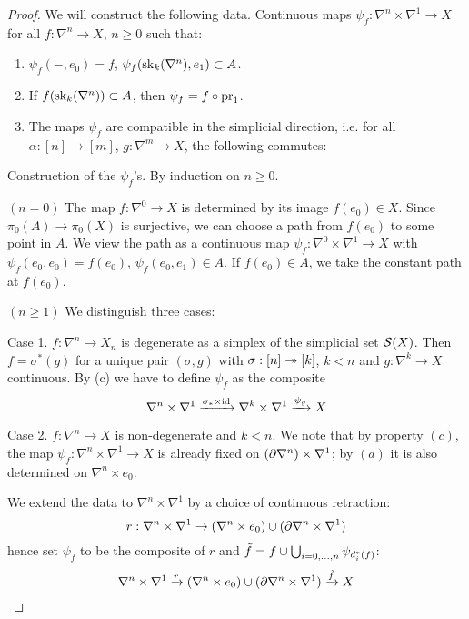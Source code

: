 \begin{proof}
We will construct the following data. Continuous maps $\psi_f:\nabla^n\times\nabla^1\to X$ for all $f:\nabla^n\to X$, $n\geq 0$ such that:
\begin{enumerate}[label={(\alph*)}]
    \item $\psi_f(-,e_0)=f$, $\psi_f(\sk_k(\ns),e_1)\subset A$.
    \item If $f(\sk_k(\ns))\subset A$, then $\psi_f=f\circ\pr_1$.
    \item The maps $\psi_f$ are compatible in the simplicial direction, i.e. for all $\alpha:[n]\to[m]$, $g:\nabla^m\to X$, the following commutes:
    \begin{center}
    \end{center}
\end{enumerate}

Construction of the $\psi_f$'s. By induction on $n\geq0$.

$(n=0)$ The map $f:\nabla^0\to X$ is determined by its image $f(e_0)\in X$. Since $\pi_0(A)\to\pi_0(X)$ is surjective, we can choose a path from $f(e_0)$ to some point in $A$. We view the path as a continuous map $\psi_f:\nabla^0\times\nabla^1\to X$ with $\psi_f(e_0,e_0)=f(e_0)$, $\psi_f(e_0,e_1)\in A$. If $f(e_0)\in A$, we take the constant path at $f(e_0)$.

$(n\geq1)$ We distinguish three cases:

Case 1. $f:\nabla^n\to X_n$ is degenerate as a simplex of the simplicial set $\S(X)$. Then $f=\sigma^*(g)$ for a unique pair $(\sigma,g)$ with $\sigma:[n]\onto[k]$, $k<n$ and $g:\nabla^k\to X$ continuous. By (c) we have to define $\psi_f$ as the composite
\[\nabla^n\times\nabla^1\xto{\sigma_*\times\id}\nabla^k\times\nabla^1\xto{\psi_g} X\]

Case 2. $f:\nabla^n\to X$ is non-degenerate and $k<n$. We note that by property $(c)$, the map $\psi_f:\nabla^n\times\nabla^1\to X$ is already fixed on $(\de\nabla^n)\times\nabla^1$; by $(a)$ it is also determined on $\nabla^n\times e_0$.

We extend the data to $\nabla^n\times\nabla^1$ by a choice of continuous retraction:
\[r:\nabla^n\times\nabla^1\to (\nabla^n\times e_0)\cup(\de\nabla^n\times\nabla^1)\]
hence set $\psi_f$ to be the composite of $r$ and $\til f=f\cup\bigcup_{i=0,\dots,n}\psi_{d_i^*(f)}$\normalmarginpar{}:
\[\ns\times\sx{1}\xto{r}(\nabla^n\times e_0)\cup(\de\nabla^n\times\nabla^1)\xto{\til f} X\]


\end{proof}
